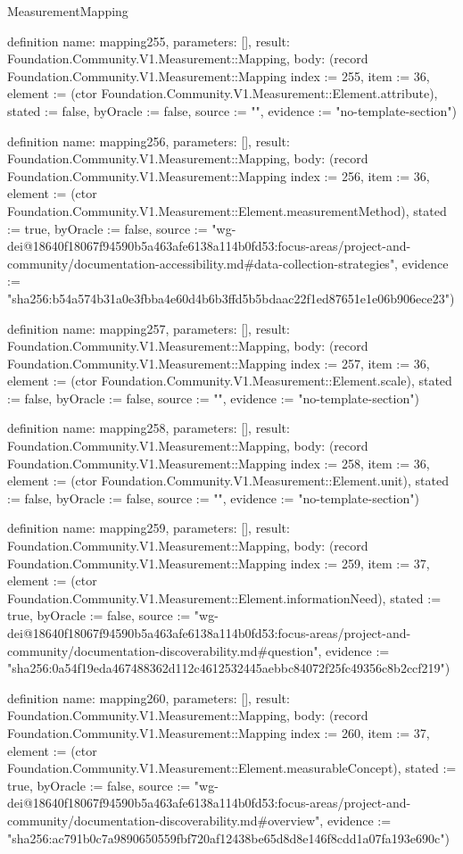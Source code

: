 \begin{lexlean}{MeasurementMapping}
\begin{semanticmodule}
definition{
  name: mapping255,
  parameters: [],
  result: Foundation.Community.V1.Measurement::Mapping,
  body: (record Foundation.Community.V1.Measurement::Mapping {index := 255, item := 36, element := (ctor Foundation.Community.V1.Measurement::Element.attribute), stated := false, byOracle := false, source := "", evidence := "no-template-section"})
}

definition{
  name: mapping256,
  parameters: [],
  result: Foundation.Community.V1.Measurement::Mapping,
  body: (record Foundation.Community.V1.Measurement::Mapping {index := 256, item := 36, element := (ctor Foundation.Community.V1.Measurement::Element.measurementMethod), stated := true, byOracle := false, source := "wg-dei@18640f18067f94590b5a463afe6138a114b0fd53:focus-areas/project-and-community/documentation-accessibility.md#data-collection-strategies", evidence := "sha256:b54a574b31a0e3fbba4e60d4b6b3ffd5b5bdaac22f1ed87651e1e06b906ece23"})
}

definition{
  name: mapping257,
  parameters: [],
  result: Foundation.Community.V1.Measurement::Mapping,
  body: (record Foundation.Community.V1.Measurement::Mapping {index := 257, item := 36, element := (ctor Foundation.Community.V1.Measurement::Element.scale), stated := false, byOracle := false, source := "", evidence := "no-template-section"})
}

definition{
  name: mapping258,
  parameters: [],
  result: Foundation.Community.V1.Measurement::Mapping,
  body: (record Foundation.Community.V1.Measurement::Mapping {index := 258, item := 36, element := (ctor Foundation.Community.V1.Measurement::Element.unit), stated := false, byOracle := false, source := "", evidence := "no-template-section"})
}

definition{
  name: mapping259,
  parameters: [],
  result: Foundation.Community.V1.Measurement::Mapping,
  body: (record Foundation.Community.V1.Measurement::Mapping {index := 259, item := 37, element := (ctor Foundation.Community.V1.Measurement::Element.informationNeed), stated := true, byOracle := false, source := "wg-dei@18640f18067f94590b5a463afe6138a114b0fd53:focus-areas/project-and-community/documentation-discoverability.md#question", evidence := "sha256:0a54f19eda467488362d112c4612532445aebbc84072f25fc49356c8b2ccf219"})
}

definition{
  name: mapping260,
  parameters: [],
  result: Foundation.Community.V1.Measurement::Mapping,
  body: (record Foundation.Community.V1.Measurement::Mapping {index := 260, item := 37, element := (ctor Foundation.Community.V1.Measurement::Element.measurableConcept), stated := true, byOracle := false, source := "wg-dei@18640f18067f94590b5a463afe6138a114b0fd53:focus-areas/project-and-community/documentation-discoverability.md#overview", evidence := "sha256:ac791b0c7a9890650559fbf720af12438be65d8d8e146f8cdd1a07fa193e690c"})
}


\end{semanticmodule}
\end{lexlean}

